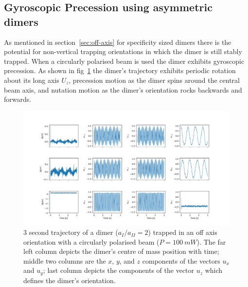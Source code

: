 \subsection{Gyroscopic Precession using asymmetric dimers}
As mentioned in section~\ref{sec:off-axis} for specificity sized dimers there 
is the potential for non-vertical trapping orientations in which the dimer is 
still stably trapped. When a circularly polarised beam is used the dimer exhibits gyroscopic precession. As shown in fig~\ref{fig:gyro} the dimer's trajectory exhibits periodic rotation about its long axis $U_z$, precession motion as the dimer spins around the central beam axis, and nutation motion as the dimer's orientation rocks backwards and forwards. 
\begin{figure}[h]
	\centering
	\includegraphics[width=\linewidth]{gyroscopic_precession.png}
	\caption{3 second trajectory of a dimer ($a_{I}/a_{II}=2$) trapped in an 
		off axis orientation with a circularly polarised beam ($P= 100\ mW$). 
		The far left column depicts the dimer's centre of mass position with 
		time; middle two columns are the $x$, $y$, and $z$ components of the 
		vectors $u_x$ and $u_y$; last column depicts the components of the 
		vector $u_z$ which defines the dimer's orientation.}
	\label{fig:gyro}
\end{figure}

